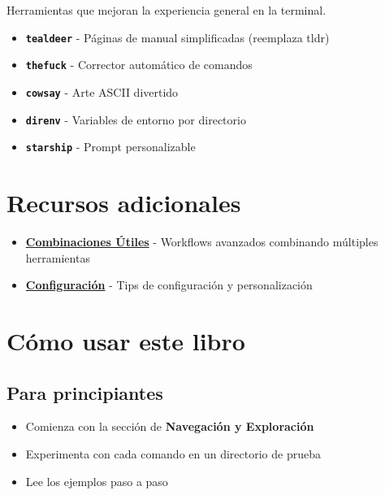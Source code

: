 \documentclass[
  11pt,
  letterpaper,
  oneside,
  openany]{scrbook}
\providecommand{\tightlist}{%
  \setlength{\itemsep}{0pt}\setlength{\parskip}{0pt}}
\begin{document}
Herramientas que mejoran la experiencia general en la terminal.

\begin{itemize}
\tightlist
\item
  \textbf{\texttt{tealdeer}} - Páginas de manual simplificadas
  (reemplaza tldr)
\item
  \textbf{\texttt{thefuck}} - Corrector automático de comandos
\item
  \textbf{\texttt{cowsay}} - Arte ASCII divertido
\item
  \textbf{\texttt{direnv}} - Variables de entorno por directorio
\item
  \textbf{\texttt{starship}} - Prompt personalizable
\end{itemize}

\section*{Recursos adicionales}\label{recursos-adicionales}


\begin{itemize}
\tightlist
\item
  \textbf{\href{combinaciones.qmd}{Combinaciones Útiles}} - Workflows
  avanzados combinando múltiples herramientas
\item
  \textbf{\href{configuracion.qmd}{Configuración}} - Tips de
  configuración y personalización
\end{itemize}

\section*{Cómo usar este libro}\label{cuxf3mo-usar-este-libro}


\subsection*{Para principiantes}\label{para-principiantes}

\begin{itemize}
\tightlist
\item
  Comienza con la sección de \textbf{Navegación y Exploración}
\item
  Experimenta con cada comando en un directorio de prueba
\item
  Lee los ejemplos paso a paso
\end{itemize}
\end{document}
